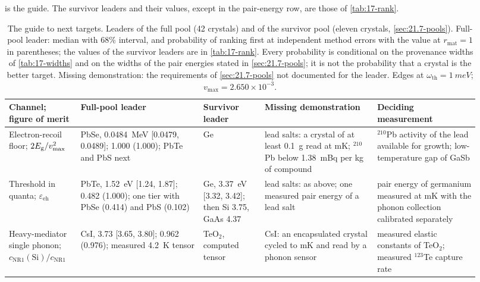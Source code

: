  is the guide. The survivor leaders and their values, except in the pair-energy row, are those of \cref{tab:17-rank}.

\begin{table}[tbp]
  \caption{The guide to next targets. Leaders of the full pool (42 crystals) and of the survivor pool (eleven crystals, \cref{sec:21.7-pools}). Full-pool leader: median with 68\% interval, and probability of ranking first at independent method errors with the value at $r_{\mathrm{mat}} = 1$ in parentheses; the values of the survivor leaders are in \cref{tab:17-rank}. Every probability is conditional on the provenance widths of \cref{tab:17-widths} and on the widths of the pair energies stated in \cref{sec:21.7-pools}; it is not the probability that a crystal is the better target. Missing demonstration: the requirements of \cref{sec:21.7-pools} not documented for the leader. Edges at $\omega_{\mathrm{th}} = \SI{1}{meV}$; $v_{\mathrm{max}} = 2.650\times10^{-3}$.}
  \label{tab:21-guide}
  \centering\scriptsize\setlength{\tabcolsep}{3pt}
  \begin{tabular}{@{}>{\raggedright\arraybackslash}p{0.14\linewidth}>{\raggedright\arraybackslash}p{0.24\linewidth}>{\raggedright\arraybackslash}p{0.12\linewidth}>{\raggedright\arraybackslash}p{0.22\linewidth}>{\raggedright\arraybackslash}p{0.20\linewidth}@{}}
    \toprule
    Channel; figure of merit & Full-pool leader & Survivor leader & Missing demonstration & Deciding measurement \\
    \midrule
    Electron-recoil floor; $2E_{\mathrm{g}}/v_{\mathrm{max}}^2$ & PbSe, \SI{0.0484}{MeV} [0.0479, 0.0489]; 1.000 (1.000); PbTe and PbS next & Ge & lead salts: a crystal of at least \SI{0.1}{g} read at mK; $^{210}$Pb below \SI{1.38}{mBq} per kg of compound & $^{210}$Pb activity of the lead available for growth; low-temperature gap of GaSb \\
    Threshold in quanta; $\varepsilon_{\mathrm{eh}}$ & PbTe, \SI{1.52}{eV} [1.24, 1.87]; 0.482 (1.000); one tier with PbSe (0.414) and PbS (0.102) & Ge, \SI{3.37}{eV} [3.32, 3.42]; then Si 3.75, GaAs 4.37 & lead salts: as above; one measured pair energy of a lead salt & pair energy of germanium measured at mK with the phonon collection calibrated separately \\
    Heavy-mediator single phonon; $c_{\mathrm{NR1}}(\mathrm{Si})/c_{\mathrm{NR1}}$ & CsI, 3.73 [3.65, 3.80]; 0.962 (0.976); measured \SI{4.2}{K} tensor & TeO$_2$, computed tensor & CsI: an encapsulated crystal cycled to mK and read by a phonon sensor & measured elastic constants of TeO$_2$; measured $^{123}$Te capture rate \\

\end{tabular}
\end{table}
